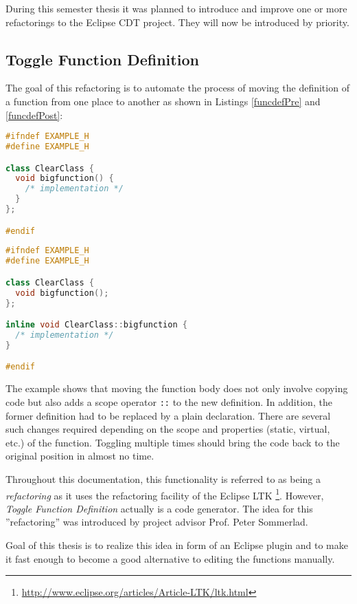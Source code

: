 During this semester thesis it was planned to introduce and improve one or more
refactorings to the Eclipse CDT project. They will now be introduced by 
priority.

\subsection{Toggle Function Definition}
The goal of this refactoring is to automate the process of moving the definition 
of a function from one place to another as shown in Listings
\ref{funcdefPre} and \ref{funcdefPost}:\newline

\begin{lstlisting}[caption={Initial situation: member function defined inside a
class},label={funcdefPre},language=C++]
#ifndef EXAMPLE_H
#define EXAMPLE_H

class ClearClass {
  void bigfunction() {
    /* implementation */
  }
};

#endif
\end{lstlisting}

\begin{lstlisting}[caption={Separated definition after toggling},
label={funcdefPost},language=C++]
#ifndef EXAMPLE_H
#define EXAMPLE_H

class ClearClass {
  void bigfunction();
};

inline void ClearClass::bigfunction {
  /* implementation */
}

#endif
\end{lstlisting}

The example shows that moving the function body does not only involve copying 
code but also adds a scope operator \texttt{::} to the new definition. In addition, the 
former definition had to be replaced by a plain declaration. There are several 
such changes required depending on the scope and properties (static, virtual, 
etc.) of the function. Toggling multiple times should bring the code back to the 
original position in almost no time. 

Throughout this documentation, this functionality is referred to as being a 
\textit{refactoring} as it uses the refactoring facility of the Eclipse LTK
\footnote{\url{http://www.eclipse.org/articles/Article-LTK/ltk.html}}. However, 
\textit{Toggle Function Definition} actually is a code generator. The idea for 
this ''refactoring'' was introduced by project advisor Prof. Peter Sommerlad.

Goal of this thesis is to realize this idea in form of an Eclipse plugin and to 
make it fast enough to become a good alternative to editing the functions 
manually. 

